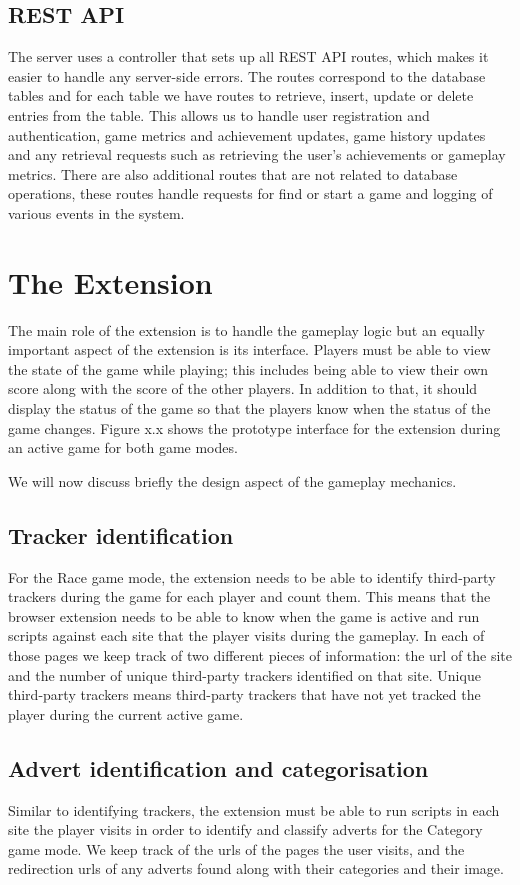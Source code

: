 \documentclass{l4proj}
\begin{document}
\subsection{REST API}
The server uses a controller that sets up all REST API routes, which makes it easier to handle any server-side errors. The routes correspond to the database tables and for each table we have routes to retrieve, insert, update or delete entries from the table. This allows us to handle user registration and authentication, game metrics and achievement updates, game history updates and any retrieval requests such as retrieving the user's achievements or gameplay metrics. There are also additional routes that are not related to database operations, these routes handle requests for find or start a game and logging of various events in the system.

\section{The Extension}
The main role of the extension is to handle the gameplay logic but an equally important aspect of the extension is its interface. Players must be able to view the state of the game while playing; this includes being able to view their own score along with the score of the other players. In addition to that, it should display the status of the game so that the players know when the status of the game changes. Figure x.x shows the prototype interface for the extension during an active game for both game modes.

We will now discuss briefly the design aspect of the gameplay mechanics.

\subsection{Tracker identification}
For the Race game mode, the extension needs to be able to identify third-party trackers during the game for each player and count them. This means that the browser extension needs to be able to know when the game is active and run scripts against each site that the player visits during the gameplay. In each of those pages we keep track of two different pieces of information: the url of the site and the number of unique third-party trackers identified on that site. Unique third-party trackers means third-party trackers that have not yet tracked the player during the current active game.

\subsection{Advert identification and categorisation}
Similar to identifying trackers, the extension must be able to run scripts in each site the player visits in order to identify and classify adverts for the Category game mode. We keep track of the urls of the pages the user visits, and the redirection urls of any adverts found along with their categories and their image. 
\end{document}
